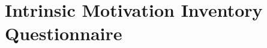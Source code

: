 \documentclass{uofsthesis-cs}
\begin{document}
\chapter{Intrinsic Motivation Inventory Questionnaire}                    \label{app:q-ini}         \noindent{}
\end{document}
